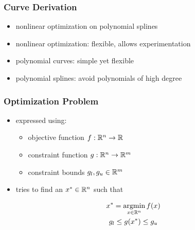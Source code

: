 \documentclass[mathserif]{beamer}
\begin{document}
		\begin{frame}
			\frametitle{Curve Derivation}
			\begin{itemize}
				\item nonlinear optimization on polynomial splines %
				\item nonlinear optimization: flexible, allows experimentation
				\item polynomial curves: simple yet flexible %
				\item polynomial splines: avoid polynomials of high degree
			\end{itemize}
		\end{frame}

		\begin{frame}
			\frametitle{Optimization Problem}
			\begin{itemize}
				\item expressed using:
				\begin{itemize}
					\item objective function \(f : \mathbb{R}^{n} \rightarrow \mathbb{R}\)
					\item constraint function \(g : \mathbb{R}^{n} \rightarrow \mathbb{R}^{m}\)
					\item constraint bounds \(g_l, g_u \in \mathbb{R}^{m}\)
				\end{itemize} 
				\item tries to find an \(x^* \in \mathbb{R}^{n}\) such that 
			\end{itemize}
			\begin{equation*}
				\begin{gathered}
					x^* = \operatorname*{argmin}_{x \in \mathbb{R}^{n}} f\!\left( x \right)\\
					g_l \leq g\!\left( x^* \right) \leq g_u
				\end{gathered}
			\end{equation*}
		\end{frame}
\end{document}
